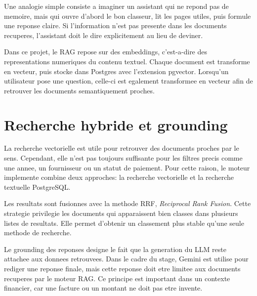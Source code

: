 Une analogie simple consiste a imaginer un assistant qui ne repond pas de memoire, mais qui ouvre d'abord le bon classeur, lit les pages utiles, puis formule une reponse claire. Si l'information n'est pas presente dans les documents recuperes, l'assistant doit le dire explicitement au lieu de deviner.

Dans ce projet, le RAG repose sur des embeddings, c'est-a-dire des representations numeriques du contenu textuel. Chaque document est transforme en vecteur, puis stocke dans Postgres avec l'extension pgvector. Lorsqu'un utilisateur pose une question, celle-ci est egalement transformee en vecteur afin de retrouver les documents semantiquement proches.

\section{Recherche hybride et grounding}

La recherche vectorielle est utile pour retrouver des documents proches par le sens. Cependant, elle n'est pas toujours suffisante pour les filtres precis comme une annee, un fournisseur ou un statut de paiement. Pour cette raison, le moteur implemente combine deux approches: la recherche vectorielle et la recherche textuelle PostgreSQL.

Les resultats sont fusionnes avec la methode RRF, \textit{Reciprocal Rank Fusion}. Cette strategie privilegie les documents qui apparaissent bien classes dans plusieurs listes de resultats. Elle permet d'obtenir un classement plus stable qu'une seule methode de recherche.

Le grounding des reponses designe le fait que la generation du LLM reste attachee aux donnees retrouvees. Dans le cadre du stage, Gemini est utilise pour rediger une reponse finale, mais cette reponse doit etre limitee aux documents recuperes par le moteur RAG. Ce principe est important dans un contexte financier, car une facture ou un montant ne doit pas etre invente.
